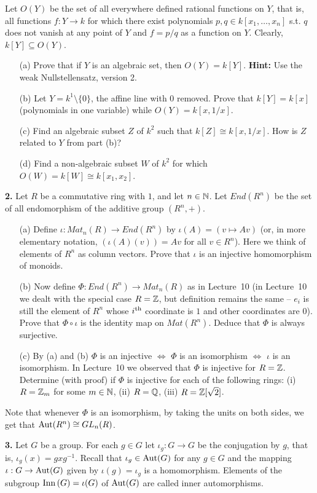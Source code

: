 \documentclass[12pt]{amsart}
\begin{document}
\sk Let $O(Y)$ be the set of all everywhere defined rational functions on $Y$, that is,
all functions $f:Y\to k$ for which there exist polynomials $p,q\in k[x_1,\ldots, x_n]$
s.t. $q$ does not vanish at any point of $Y$ and $f=p/q$ as a function on $Y$. Clearly,
$k[Y]\subseteq O(Y)$.
\begin{itemize}
\item[(a)] Prove that if $Y$ is an algebraic set, then $O(Y)=k[Y]$. {\bf Hint:} Use the weak
Nullstellensatz, version 2.
\item[(b)] Let $Y=k^1\setminus\{0\}$, the affine line with $0$ removed. Prove that
$k[Y]=k[x]$ (polynomials in one variable) while $O(Y)=k[x,1/x]$.
\item[(c)] Find an algebraic subset $Z$ of $k^2$ such that $k[Z]\cong k[x,1/x]$.
How is $Z$ related to $Y$ from part (b)?
\item[(d)] Find a non-algebraic subset $W$ of $k^2$ for which $O(W)=k[W]\cong k[x_1,x_2]$.
\end{itemize}
\skv
{\bf 2.} Let $R$ be a commutative ring with $1$, and let $n\in{\mathbb N}$. Let $End(R^n)$ be the set of all endomorphism of the additive group $(R^n,+)$.
\begin{itemize}
\item[(a)] Define $\iota: Mat_n(R)\to End(R^n)$ by $\iota(A)=(v\mapsto Av)$ (or, in more elementary notation,
$(\iota(A)(v))=Av$ for all $v\in R^n$). Here we think of elements of $R^n$ as column vectors. Prove that
$\iota$ is an injective homomorphism of monoids.
\item[(b)] Now define $\Phi: End(R^n)\to Mat_n(R)$ as in Lecture~10 (in Lecture~10 we dealt with the special case $R={\mathbb Z}$,
but definition remains the same -- $e_i$ is still the element of $R^n$ whose $i^{\rm th}$ coordinate is $1$ and other coordinates
are $0$). Prove that $\Phi\circ \iota$ is the identity map on $Mat(R^n)$. Deduce that $\Phi$ is always surjective.
\item[(c)] By (a) and (b) $\Phi$ is an injective $\iff$ $\Phi$ is an isomorphism $\iff$ $\iota$ is an isomorphism.
In Lecture~10 we observed that $\Phi$ is injective for $R={\mathbb Z}$. Determine (with proof) if $\Phi$ is injective 
for each of the following rings: (i) $R={\mathbb Z}_m$ for some $m\in{\mathbb N}$, (ii) $R={\mathbb Q}$, (iii) $R={\mathbb Z}[\sqrt{2}]$. 
\end{itemize}
Note that whenever $\Phi$ is an isomorphism, by taking the units on both sides, we get that ${\rm Aut}(R^n)\cong GL_n(R)$.

\skv
{\bf 3.} Let $G$ be a group. For each $g\in G$ let $\iota_g: G\to G$
be the conjugation by $g$, that is, $\iota_g(x)=gxg^{-1}$.
Recall that $\iota_g\in {\rm Aut}(G)$ for any $g\in G$ and
the mapping $\iota: G\to {\rm Aut}(G)$ given by $\iota(g)=\iota_g$
is a homomorphism. Elements of the subgroup ${\rm Inn\,}(G)=\iota(G)$ of ${\rm Aut}(G)$
are called inner automorphisms.
\end{document}
